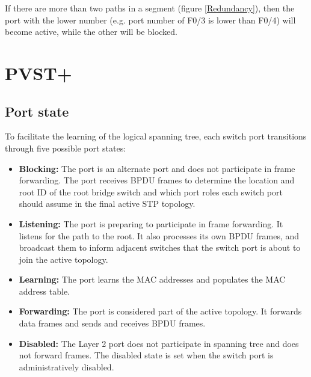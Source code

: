 If there are more than two paths in a segment (figure \ref{Redundancy}), then the port with the lower number (e.g. port number of F0/3 is lower than F0/4) will become active, while the other will be blocked.

\section{PVST+}

\subsection{Port state}

To facilitate the learning of the logical spanning tree, each switch port transitions through five possible port states:

\begin{itemize}
\item \textbf{Blocking:} The port is an alternate port and does not participate in frame forwarding. The port receives BPDU frames to determine the location and root ID of the root bridge switch and which port roles each switch port should assume in the final active STP topology.
\item \textbf{Listening:} The port is preparing to participate in frame forwarding. It listens for the path to the root. It also processes its own BPDU frames, and broadcast them to inform adjacent switches that the switch port is about to join the active topology.
\item \textbf{Learning:} The port learns the MAC addresses and populates the MAC address table. 
\item \textbf{Forwarding:} The port is considered part of the active topology. It forwards data frames and sends and receives BPDU frames. 
\item \textbf{Disabled:} The Layer 2 port does not participate in spanning tree and does not forward frames. The disabled state is set when the switch port is administratively disabled.
\end{itemize}

